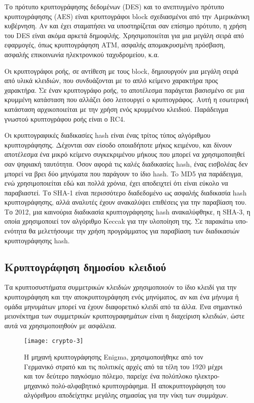 Το πρότυπο κρυπτογράφησης δεδομένων (DES) και το ανεπτυγμένο πρότυπο κρυπτογράφησης (AES) είναι κρυπτογράφοι block σχεδιασμένοι από την Αμερικάνικη κυβέρνηση. Αν και έχει σταματήσει να υποστηρίζεται σαν επίσημο πρότυπο, η χρήση του DES είναι ακόμα αρκετά δημοφιλής. Χρησιμοποιείται για μια μεγάλη σειρά από εφαρμογές, όπως κρυπτογράφηση ATM, ασφαλής απομακρυσμένη πρόσβαση, ασφαλής επικοινωνία ηλεκτρονικού ταχυδρομείου, κ.α.

Οι κρυπτογράφοι ροής, σε αντίθεση με τους block, δημιουργούν μια μεγάλη σειρά από υλικά κλειδιών, που συνδυάζονται με το απλό κείμενο χαρακτήρα προς χαρακτήρα. Σε έναν κρυπτογράφο ροής, το αποτέλεσμα παράγεται βασισμένο σε μια κρυμμένη κατάσταση που αλλάζει όσο λειτουργεί ο κρυπτογράφος. Αυτή η εσωτερική κατάσταση αρχικοποιείται με την χρήση ενός κρυμμένου κλειδιού. Παράδειγμα γνωστού κρυπτογράφου ροής είναι ο RC4.\cite{cryptography-3}

Οι κρυπτογραφικές διαδικασίες hash είναι ένας τρίτος τύπος αλγόριθμου κρυπτογράφησης. Δέχονται σαν είσοδο οποιαδήποτε μήκος κειμένου, και δίνουν αποτέλεσμα ένα μικρό κείμενο συγκεκριμένου μήκους που μπορεί να χρησιμοποιηθεί σαν ψηφιακή ταυτότητα. Όσον αφορά τις καλές διαδικασίες hash, ένας εισβολέας δεν μπορεί να βρει δύο μηνύματα που παράγουν το ίδιο hash. \cite{cryptography-4}To MD5 για παράδειγμα, ενώ χρησιμοποιείται εδώ και πολλά χρόνια, έχει αποδειχτεί ότι είναι εύκολο να παραβιαστεί. Το SHA-1 είναι περισσότερο διαδεδομένο ως ασφαλής διαδικασία hash κρυπτογράφησης, αλλά αναλυτές έχουν ανακαλύψει επιθέσεις για την παραβίαση του. Το 2012, μια καινούρια διαδικασία κρυπτογράφησης hash ανακαλύφθηκε, η SHA-3, η οποία χρησιμοποιεί τον αλγόριθμο Keccak για την υλοποίηση της. Σε παρακάτω υπο-ενότητα θα μελετήσουμε την χρήση προγράμματος για παραβίαση των διαδικασιών κρυπτογράφησης hash.\cite{cryptography-5}
\subsection{Κρυπτογράφηση δημοσίου κλειδιού}
Τα κρυπτοσυστήματα συμμετρικών κλειδιών χρησιμοποιούν το ίδιο κλειδί για την κρυπτογράφηση και την αποκρυπτογράφηση ενός μηνύματος, αν και ένα μήνυμα ή ομάδα μηνυμάτων μπορεί να έχουν διαφορετικό κλειδί από τα άλλα. Ένα σημαντικό μειονέκτημα των συμμετρικών κρυπτογραφημάτων είναι η διαχείριση κλειδιών, ώστε αυτά να χρησιμοποιηθούν με ασφάλεια. 

\begin{figure}[h]
\centering
\texttt{[image: crypto-3]}
\caption{Η μηχανή κρυπτογράφησης Enigma, χρησιμοποιήθηκε από τον Γερμανικό στρατό και τις πολιτικές αρχές από τα τέλη του 1920 μέχρι και τον δεύτερο παγκόσμιο πόλεμο, παρείχε ένα πολύπλοκο ηλεκτρο-μηχανικό πολύ-αλφαβητικό κρυπτογράφημα. H αποκρυπτογράφηση του αλγόριθμου αποδείχτηκε μεγάλης σημασίας για την νίκη των συμμάχων.\cite{figure-9}}
\end{figure}

